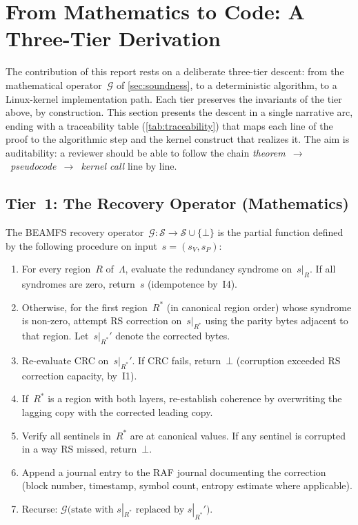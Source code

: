 \section{From Mathematics to Code: A Three-Tier Derivation}\label{sec:m2c}

The contribution of this report rests on a deliberate three-tier
descent: from the mathematical operator~\(\mathcal{G}\) of
\cref{sec:soundness}, to a deterministic algorithm, to a Linux-kernel
implementation path. Each tier preserves the invariants of the tier
above, by construction. This section presents the descent in a single
narrative arc, ending with a traceability table
(\cref{tab:traceability}) that maps each line of the proof to the
algorithmic step and the kernel construct that realizes it. The aim
is auditability: a reviewer should be able to follow the chain
\emph{theorem~\(\rightarrow\)~pseudocode~\(\rightarrow\)~kernel call} line
by line.

\subsection{Tier~1: The Recovery Operator (Mathematics)}\label{sec:m2c-tier1}

\begin{definition}\label{def:G}
The BEAMFS recovery operator~\(\mathcal{G} : \mathcal{S} \to
\mathcal{S} \cup \{\bot\}\) is the partial function defined by the
following procedure on input~\(s = (s_V, s_P)\):
\begin{enumerate}
\item For every region~\(R\) of~\(\Lambda\), evaluate the redundancy
  syndrome on~\(s|_R\). If all syndromes are zero, return~\(s\)
  (idempotence by~I4).
\item Otherwise, for the first region~\(R^{*}\) (in canonical region
  order) whose syndrome is non-zero, attempt RS correction
  on~\(s|_{R^{*}}\) using the parity bytes adjacent to that region.
  Let~\(s|_{R^{*}}'\) denote the corrected bytes.
\item Re-evaluate CRC on~\(s|_{R^{*}}'\). If CRC fails, return~\(\bot\)
  (corruption exceeded RS correction capacity, by~I1).
\item If~\(R^{*}\) is a region with both layers, re-establish coherence
  by overwriting the lagging copy with the corrected leading copy.
\item Verify all sentinels in~\(R^{*}\) are at canonical values. If
  any sentinel is corrupted in a way RS missed, return~\(\bot\).
\item Append a journal entry to the RAF journal documenting the
  correction (block number, timestamp, symbol count, entropy
  estimate where applicable).
\item Recurse: \(\mathcal{G}\bigl(\text{state with } s|_{R^{*}}
  \text{ replaced by } s|_{R^{*}}'\bigr)\).
\end{enumerate}
\end{definition}

